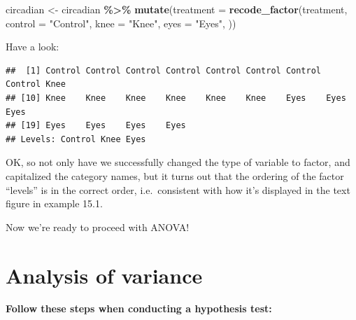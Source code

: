 \documentclass[
]{book}
\newenvironment{Shaded}{\begin{snugshade}}{\end{snugshade}}
\newcommand{\AttributeTok}[1]{\textcolor[rgb]{0.13,0.29,0.53}{#1}}
\newcommand{\FunctionTok}[1]{\textcolor[rgb]{0.13,0.29,0.53}{\textbf{#1}}}
\newcommand{\NormalTok}[1]{#1}
\newcommand{\OtherTok}[1]{\textcolor[rgb]{0.56,0.35,0.01}{#1}}
\newcommand{\SpecialCharTok}[1]{\textcolor[rgb]{0.81,0.36,0.00}{\textbf{#1}}}
\newcommand{\StringTok}[1]{\textcolor[rgb]{0.31,0.60,0.02}{#1}}
\begin{document}
\begin{Shaded}
\begin{Highlighting}[]
\NormalTok{circadian }\OtherTok{\textless{}{-}}\NormalTok{ circadian }\SpecialCharTok{\%\textgreater{}\%}
  \FunctionTok{mutate}\NormalTok{(}\AttributeTok{treatment =} \FunctionTok{recode\_factor}\NormalTok{(treatment, }\AttributeTok{control =} \StringTok{"Control"}\NormalTok{, }\AttributeTok{knee =} \StringTok{"Knee"}\NormalTok{, }\AttributeTok{eyes =} \StringTok{"Eyes"}\NormalTok{, ))}
\end{Highlighting}
\end{Shaded}

Have a look:

\begin{Shaded}
\end{Shaded}

\begin{verbatim}
##  [1] Control Control Control Control Control Control Control Control Knee   
## [10] Knee    Knee    Knee    Knee    Knee    Knee    Eyes    Eyes    Eyes   
## [19] Eyes    Eyes    Eyes    Eyes   
## Levels: Control Knee Eyes
\end{verbatim}

OK, so not only have we successfully changed the type of variable to factor, and capitalized the category names, but it turns out that the ordering of the factor ``levels'' is in the correct order, i.e.~consistent with how it's displayed in the text figure in example 15.1.

Now we're ready to proceed with ANOVA!

\section{Analysis of variance}\label{do_the_anova}

\textbf{Follow these steps when conducting a hypothesis test:}
\end{document}
